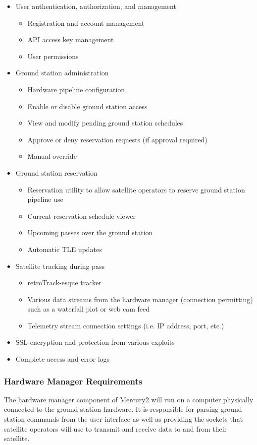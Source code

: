 \documentclass{mxl-design}
\begin{document}
\begin{itemize}
	\item User authentication, authorization, and management
		\begin{itemize}
			\item Registration and account management
			\item API access key management
			\item User permissions
		\end{itemize}
	\item Ground station administration
		\begin{itemize}
			\item Hardware pipeline configuration
			\item Enable or disable ground station access
			\item View and modify pending ground station schedules
			\item Approve or deny reservation requests (if approval required)
			\item Manual override
		\end{itemize}
	\item Ground station reservation
		\begin{itemize}
			\item Reservation utility to allow satellite operators to reserve ground station pipeline use
			\item Current reservation schedule viewer
			\item Upcoming passes over the ground station
			\item Automatic TLE updates
		\end{itemize}
	\item Satellite tracking during pass
		\begin{itemize}
			\item retroTrack-esque tracker
			\item Various data streams from the hardware manager (connection permitting) such as a waterfall plot or web cam feed
			\item Telemetry stream connection settings (i.e. IP address, port, etc.)
		\end{itemize}
	\item SSL encryption and protection from various exploits	
	\item Complete access and error logs
\end{itemize} 

\subsubsection{Hardware Manager Requirements}
The hardware manager component of Mercury2 will run on a computer physically connected to the ground station hardware. It is responsible for parsing ground station commands from the user interface as well as providing the sockets that satellite operators will use to transmit and receive data to and from their satellite.
\end{document}
